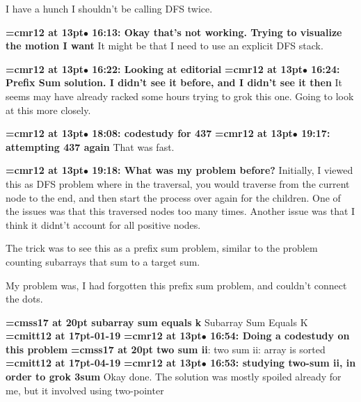 I have a hunch I shouldn't be calling DFS twice.
\par

{\smallskip\noindent\bf\font\titlefont=cmr12 at 13pt\titlefont $\bullet$ 16:13: Okay that's not working. Trying to visualize the motion I want}\smallskip
It might be that I need to use an explicit DFS stack.
\par

{\smallskip\noindent\bf\font\titlefont=cmr12 at 13pt\titlefont $\bullet$ 16:22: Looking at editorial}\smallskip
{\smallskip\noindent\bf\font\titlefont=cmr12 at 13pt\titlefont $\bullet$ 16:24: Prefix Sum solution. I didn't see it before, and I didn't see it then}\smallskip
It seems may have already racked some hours trying to grok this one. Going to look at this more closely.
\par

{\smallskip\noindent\bf\font\titlefont=cmr12 at 13pt\titlefont $\bullet$ 18:08: codestudy for 437}\smallskip
{\smallskip\noindent\bf\font\titlefont=cmr12 at 13pt\titlefont $\bullet$ 19:17: attempting 437 again}\smallskip
That was fast.
\par

{\smallskip\noindent\bf\font\titlefont=cmr12 at 13pt\titlefont $\bullet$ 19:18: What was my problem before?}\smallskip
Initially, I viewed this as DFS problem where in the traversal, you would traverse from the current node to the end, and then start the process over again for the children. One of the issues was that this traversed nodes too many times. Another issue was that I think it didnt't account for all positive nodes.
\par

The trick was to see this as a prefix sum problem, similar to the problem counting subarrays that sum to a target sum.
\par

My problem was, I had forgotten this prefix sum problem, and couldn't connect the dots.
\par

{\medskip\noindent\bf\font\titlefont=cmss17 at 20pt subarray sum equals k} Subarray Sum Equals K
{\medskip\noindent\bf\font\titlefont=cmitt12 at 17pt-01-19}\medskip
{\smallskip\noindent\bf\font\titlefont=cmr12 at 13pt\titlefont $\bullet$ 16:54: Doing a codestudy on this problem}\smallskip
{}
{\medskip\noindent\bf\font\titlefont=cmss17 at 20pt two sum ii}: two sum ii: array is sorted
{\medskip\noindent\bf\font\titlefont=cmitt12 at 17pt-04-19}\medskip
{\smallskip\noindent\bf\font\titlefont=cmr12 at 13pt\titlefont $\bullet$ 16:53: studying two-sum ii, in order to grok 3sum}\smallskip
Okay done. The solution was mostly spoiled already for me, but it involved using two-pointer
\par

